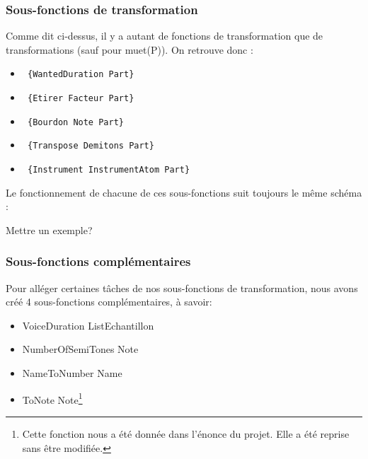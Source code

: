 \documentclass[12pt,a4paper]{article}
\begin{document}
\subsubsection{Sous-fonctions de transformation}
Comme dit ci-dessus, il y a autant de fonctions de transformation que de transformations (sauf pour muet(P)). 
On retrouve donc :
\begin{itemize}
	\item \begin{verbatim} {WantedDuration Part} \end{verbatim}
	\item \begin{verbatim} {Etirer Facteur Part} \end{verbatim}
	\item \begin{verbatim} {Bourdon Note Part} \end{verbatim}
	\item \begin{verbatim} {Transpose Demitons Part} \end{verbatim}
	\item \begin{verbatim} {Instrument InstrumentAtom Part} \end{verbatim} 
\end{itemize}

Le fonctionnement  de chacune de ces sous-fonctions suit toujours le même schéma :

Mettre un exemple?

\subsubsection{Sous-fonctions complémentaires}
Pour alléger certaines tâches de nos sous-fonctions de transformation,  nous avons créé 4 sous-fonctions complémentaires, à savoir:
\begin{itemize}
	\item {VoiceDuration ListEchantillon}
	\item {NumberOfSemiTones Note}
	\item {NameToNumber Name}
	\item {ToNote Note}\footnote{Cette fonction nous a été donnée dans l'énonce du projet. Elle a été reprise sans être modifiée.}
\end{itemize}
\end{document}
